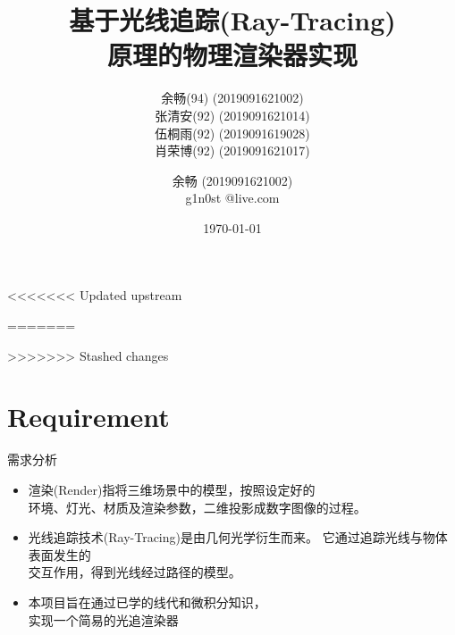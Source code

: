 \documentclass{beamer}
\begin{document}
\title[\sc Ray-Traing based Renderer]{\sc 基于光线追踪(Ray-Tracing) \\ 原理的物理渲染器实现}
<<<<<<< Updated upstream
\author{ \normalsize 余畅(94) \quad \tiny (2019091621002) \\
 \normalsize 张清安(92) \qquad \tiny (2019091621014) \\
 \normalsize 伍桐雨(92) \quad \tiny (2019091619028) \\
 \normalsize 肖荣博(92) \quad \tiny (2019091621017)}
=======
\author{ \normalsize 余畅 \quad \tiny (2019091621002)\\ \normalsize g1n0st @live.com}
>>>>>>> Stashed changes
\date{\today}
\frame{\titlepage}

\section{Requirement}
\begin{frame} {需求分析}
		\begin{itemize}
\item 渲染(Render)指将三维场景中的模型，按照设定好的 \\ 环境、灯光、材质及渲染参数，二维投影成数字图像的过程。
\item 光线追踪技术(Ray-Tracing)是由几何光学衍生而来。 它通过追踪光线与物体表面发生的 \\ 交互作用，得到光线经过路径的模型。
\item 本项目旨在通过已学的线代和微积分知识，\\实现一个简易的光追渲染器
\end{itemize}
\end{frame}
\end{document}

